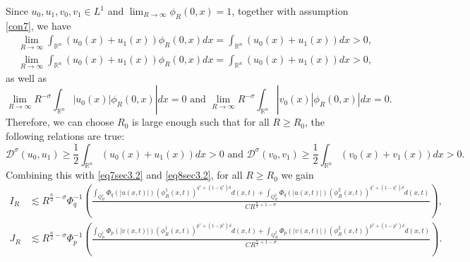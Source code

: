 \documentclass[11pt,reqno]{amsart}
\newcommand{\tron}[1]{\left( #1 \right)}
\numberwithin{equation}{section}
\newcommand{\dps}{\displaystyle}
\theoremstyle{plain}
\begin{document}
Since $u_0,u_1,v_0,v_1\in L^1$ and $\dps\lim_{R\to \infty}\phi_R(0,x)=1$, together with assumption \eqref{con7}, we have
\begin{align*}
    &\lim_{R\to \infty}\int_{\mathbb{R}^n}\tron{u_0(x)+u_1(x)}\phi_{R}(0,x)dx=\int_{\mathbb{R}^n}\tron{u_0(x)+u_1(x)}dx>0,\\
    &\lim_{R\to \infty}\int_{\mathbb{R}^n}\tron{u_0(x)+u_1(x)}\phi_{R}(0,x)dx=\int_{\mathbb{R}^n}\tron{u_0(x)+u_1(x)}dx>0,
\end{align*}
as well as
\[
\lim_{R\to \infty}R^{-\sigma}\int_{\mathbb{R}^n}|u_0(x)|\phi_R(0,x)|dx=0\text{ and }\lim_{R\to \infty}R^{-\sigma}\int_{\mathbb{R}^n}|v_0(x)|\phi_R(0,x)|dx=0.
\]
Therefore, we can choose $R_0$ is large enough such that for all $R\geq R_0$, the following relations are true:
\[
\mathcal{D}^{\sigma}(u_0,u_1)\geq \frac{1}{2}\int_{\mathbb{R}^{n}}\tron{u_0(x)+u_1(x)}d x>0\text{ and }\mathcal{D}^{\sigma}(v_0,v_1)\geq \frac{1}{2}\int_{\mathbb{R}^{n}}\tron{v_0(x)+v_1(x)}d x>0.
\] 
Combining this with \eqref{eq7sec3.2} and \eqref{eq8sec3.2}, for all $R\geq R_0$ we gain
\begin{align}
    I_R &\lesssim R^{\frac{n}{2}-\sigma} \Phi_q^{-1}\left(\frac{\dps\int_{Q^1_{R}} \Phi_q(|u(x, t)|)\left(\phi^1_R(x, t)\right)^{q^*+(1-q^*)\delta} d(x, t)+\dps\int_{Q^2_{R}} \Phi_q(|u(x, t)|)\left(\phi^2_R(x, t)\right)^{q^*+(1-q^*)\delta} d(x, t)}{CR^{\frac{n}{2}+1-\sigma}}\right) \label{eq9sec3.2}, \\
    J_R &\lesssim R^{\frac{n}{2}-\sigma} \Phi_p^{-1}\left(\frac{\dps\int_{Q^1_{R}} \Phi_p(|v(x, t)|)\left(\phi^1_R(x, t)\right)^{p^*+(1-p^*)\delta} d(x, t)+\dps\int_{Q^2_{R}} \Phi_p(|v(x, t)|)\left(\phi^2_R(x, t)\right)^{p^*+(1-p^*)\delta} d(x, t)}{CR^{\frac{n}{2}+1-\sigma}}\right).\label{eq10sec3.2}
\end{align}
\end{document}
